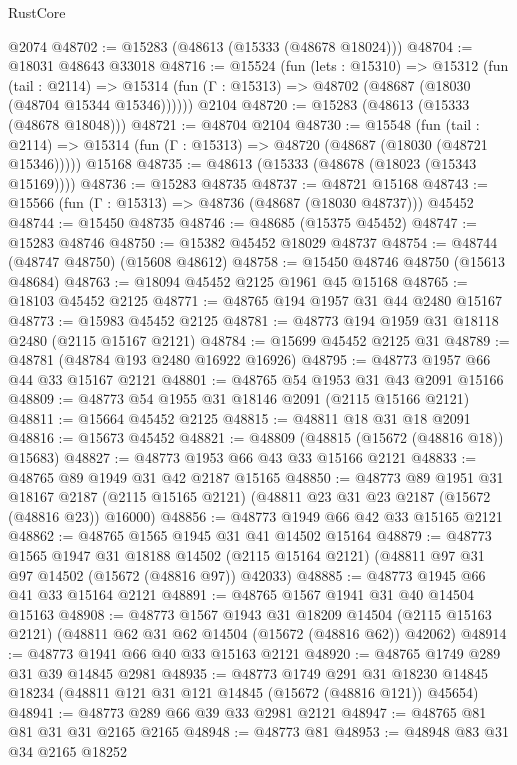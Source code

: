 \begin{lexlean}{RustCore}
\begin{coremodule}
    @2074
@48702 := @15283 (@48613 (@15333 (@48678 @18024)))
@48704 := @18031 @48643 @33018
@48716 := @15524
    (fun (lets : @15310) =>
    @15312
      (fun (tail : @2114) =>
      @15314 (fun (Γ : @15313) => @48702 (@48687 (@18030 (@48704 @15344 @15346))))))
    @2104
@48720 := @15283 (@48613 (@15333 (@48678 @18048)))
@48721 := @48704 @2104
@48730 := @15548
    (fun (tail : @2114) => @15314 (fun (Γ : @15313) => @48720 (@48687 (@18030 (@48721 @15346)))))
    @15168
@48735 := @48613 (@15333 (@48678 (@18023 (@15343 @15169))))
@48736 := @15283 @48735
@48737 := @48721 @15168
@48743 := @15566 (fun (Γ : @15313) => @48736 (@48687 (@18030 @48737))) @45452
@48744 := @15450 @48735
@48746 := @48685 (@15375 @45452)
@48747 := @15283 @48746
@48750 := @15382 @45452 @18029 @48737
@48754 := @48744 (@48747 @48750) (@15608 @48612)
@48758 := @15450 @48746 @48750 (@15613 @48684)
@48763 := @18094 @45452 @2125 @1961 @45 @15168
@48765 := @18103 @45452 @2125
@48771 := @48765 @194 @1957 @31 @44 @2480 @15167
@48773 := @15983 @45452 @2125
@48781 := @48773 @194 @1959 @31 @18118 @2480 (@2115 @15167 @2121)
@48784 := @15699 @45452 @2125 @31
@48789 := @48781 (@48784 @193 @2480 @16922 @16926)
@48795 := @48773 @1957 @66 @44 @33 @15167 @2121
@48801 := @48765 @54 @1953 @31 @43 @2091 @15166
@48809 := @48773 @54 @1955 @31 @18146 @2091 (@2115 @15166 @2121)
@48811 := @15664 @45452 @2125
@48815 := @48811 @18 @31 @18 @2091
@48816 := @15673 @45452
@48821 := @48809 (@48815 (@15672 (@48816 @18)) @15683)
@48827 := @48773 @1953 @66 @43 @33 @15166 @2121
@48833 := @48765 @89 @1949 @31 @42 @2187 @15165
@48850 := @48773
    @89
    @1951
    @31
    @18167
    @2187
    (@2115 @15165 @2121)
    (@48811 @23 @31 @23 @2187 (@15672 (@48816 @23)) @16000)
@48856 := @48773 @1949 @66 @42 @33 @15165 @2121
@48862 := @48765 @1565 @1945 @31 @41 @14502 @15164
@48879 := @48773
    @1565
    @1947
    @31
    @18188
    @14502
    (@2115 @15164 @2121)
    (@48811 @97 @31 @97 @14502 (@15672 (@48816 @97)) @42033)
@48885 := @48773 @1945 @66 @41 @33 @15164 @2121
@48891 := @48765 @1567 @1941 @31 @40 @14504 @15163
@48908 := @48773
    @1567
    @1943
    @31
    @18209
    @14504
    (@2115 @15163 @2121)
    (@48811 @62 @31 @62 @14504 (@15672 (@48816 @62)) @42062)
@48914 := @48773 @1941 @66 @40 @33 @15163 @2121
@48920 := @48765 @1749 @289 @31 @39 @14845 @2981
@48935 := @48773
    @1749
    @291
    @31
    @18230
    @14845
    @18234
    (@48811 @121 @31 @121 @14845 (@15672 (@48816 @121)) @45654)
@48941 := @48773 @289 @66 @39 @33 @2981 @2121
@48947 := @48765 @81 @81 @31 @31 @2165 @2165
@48948 := @48773 @81
@48953 := @48948 @83 @31 @34 @2165 @18252

\end{coremodule}
\end{lexlean}
